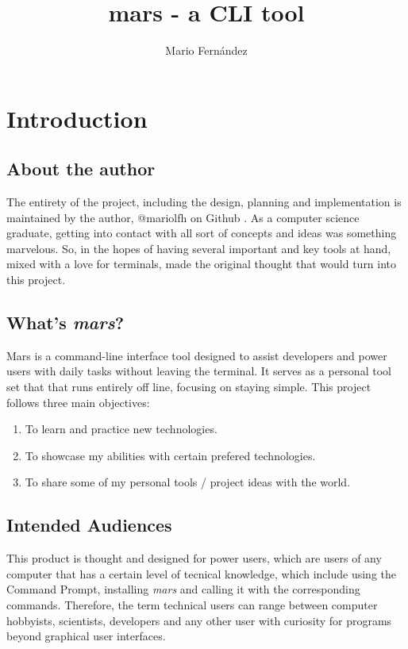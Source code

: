 \documentclass{report}
\title{mars - a CLI tool}
\author{Mario Fernández}
\begin{document}
\maketitle

\tableofcontents

\chapter{Introduction}
\section{About the author}
The entirety of the project, including the design, planning and implementation is maintained by the author, @mariolfh on Github \cite{githubinc.MariolfhOverview2025}. As a computer science graduate, getting into contact with all sort of concepts and ideas was something marvelous. So, in the hopes of having several important and key tools at hand, mixed with a love for terminals, made the original thought that would turn into this project. 

\section{What's \emph{mars}?}
Mars is a command-line interface tool designed to assist developers and power users with daily tasks without leaving the terminal. It serves as a personal tool set that that runs entirely off line, focusing on staying simple.
This project follows three main objectives:
\begin{enumerate}
\item{To learn and practice new technologies.}
\item{To showcase my abilities with certain prefered technologies.}
\item{To share some of my personal tools / project ideas with the world.}
\end{enumerate}

\section{Intended Audiences}
This product is thought and designed for power users, which are users of any computer that has a certain level of tecnical knowledge, which include using the Command Prompt, installing \emph{mars} and calling it with the corresponding commands. Therefore, the term technical users can range between computer hobbyists, scientists, developers and any other user with curiosity for programs beyond graphical user interfaces.
\end{document}
